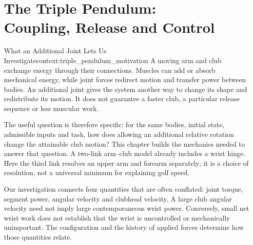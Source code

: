 \chapter[The Triple Pendulum]{The Triple Pendulum:\\Coupling, Release and Control}
\label{ch:triple_pendulum}
\raggedbottom

\begin{laymansbox}{What an Additional Joint Lets Us Investigate}{context:triple_pendulum_motivation}
A moving arm and club exchange energy through their connections. Muscles can add or absorb mechanical energy, while joint forces redirect motion and transfer power between bodies. An additional joint gives the system another way to change its shape and redistribute its motion. It does not guarantee a faster club, a particular release sequence or less muscular work.

The useful question is therefore specific: for the same bodies, initial state, admissible inputs and task, how does allowing an additional relative rotation change the attainable club motion? This chapter builds the mechanics needed to answer that question. A two-link arm--club model already includes a wrist hinge. Here the third link resolves an upper arm and forearm separately; it is a choice of resolution, not a universal minimum for explaining golf speed.
\end{laymansbox}

Our investigation connects four quantities that are often conflated: joint torque, segment power, angular velocity and clubhead velocity. A large club angular velocity need not imply large contemporaneous wrist power. Conversely, small net wrist work does not establish that the wrist is uncontrolled or mechanically unimportant. The configuration and the history of applied forces determine how those quantities relate.

